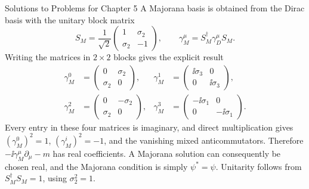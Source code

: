 \begin{bankssolutions}{Solutions to Problems for Chapter 5}
A Majorana basis is obtained from the Dirac basis with the unitary block matrix
\begin{equation*}
 S_M=\frac1{\sqrt2}
 \begin{pmatrix}1&\sigma_2\\ \sigma_2&-1\end{pmatrix},
 \qquad
 \gamma_M^\mu=S_M^\dagger\gamma_D^\mu S_M.
\end{equation*}
Writing the matrices in $2\times2$ blocks gives the explicit result
\begin{align*}
 \gamma_M^0&=\begin{pmatrix}0&\sigma_2\\ \sigma_2&0\end{pmatrix},&
 \gamma_M^1&=\begin{pmatrix}\ii\sigma_3&0\\0&\ii\sigma_3\end{pmatrix},\\
 \gamma_M^2&=\begin{pmatrix}0&-\sigma_2\\ \sigma_2&0\end{pmatrix},&
 \gamma_M^3&=\begin{pmatrix}-\ii\sigma_1&0\\0&-\ii\sigma_1\end{pmatrix}.
\end{align*}
Every entry in these four matrices is imaginary, and direct multiplication gives
$(\gamma_M^0)^2=1$, $(\gamma_M^i)^2=-1$, and the vanishing mixed
anticommutators. Therefore $-\ii\gamma_M^\mu\partial_\mu-m$ has real
coefficients. A Majorana solution can consequently be chosen real, and the
Majorana condition is simply $\psi^*=\psi$. Unitarity follows from
$S_M^\dagger S_M=1$, using $\sigma_2^2=1$.


\end{bankssolutions}

